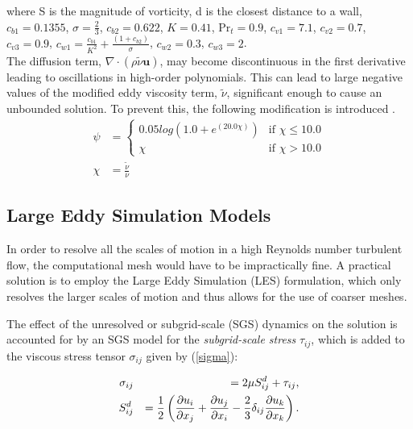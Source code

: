 where S is the magnitude of vorticity, d is the closest distance to a wall, $c_{b1} = 0.1355$, $\sigma = \frac{2}{3}$, $c_{b2} = 0.622$, $K = 0.41$, $\text{Pr}_t = 0.9$, $c_{v1} = 7.1$, $c_{v2} = 0.7$, $c_{v3} = 0.9$, $c_{w1} = \frac{c_{b1}}{K^2} + \frac{(1+c_{b2})}{\sigma}$, $c_{w2} = 0.3$, $c_{w3} = 2$.\\

The diffusion term, $\nabla\cdot(\rho\tilde\nu\boldsymbol{u})$, may become discontinuous in the first derivative leading to oscillations in high-order polynomials. This can lead to large negative values of the modified eddy viscosity term, $\tilde\nu$, significant enough to cause an unbounded solution. To prevent this, the following modification is introduced \cite{moro2011navier}.
\begin{align}
	\psi &=
	\begin{cases}
	   0.05log(1.0 + e^{(20.0\chi)}) & \text{if } \chi \le 10.0 \\
	   \chi & \text{if } \chi > 10.0
	\end{cases} \\
	\chi &= \frac{\tilde\nu}{\nu}
\end{align}

\subsection{Large Eddy Simulation Models}\label{lesmodels}

In order to resolve all the scales of motion in a high Reynolds number turbulent flow, the computational mesh would have to be impractically fine.
A practical solution is to employ the Large Eddy Simulation (LES) formulation, which only resolves the larger scales of motion and thus allows for the use of coarser meshes.

The effect of the unresolved or subgrid-scale (SGS) dynamics on the solution is accounted for by an SGS model for the \emph{subgrid-scale stress} $\tau_{ij}$, which is added to the viscous stress tensor $\sigma_{ij}$ given by (\ref{sigma}):

\begin{eqnarray}\label{tausgs}
\sigma_{ij} &&= 2 \mu S^d_{ij} + \tau_{ij},\\
S^d_{ij} &&= \frac 1 2 \left( \frac{\partial u_i}{\partial x_j} + \frac{\partial u_j}{\partial x_i} - \frac{2}{3} \delta_{ij}\frac{\partial u_k}{\partial x_k} \right).
\end{eqnarray}

